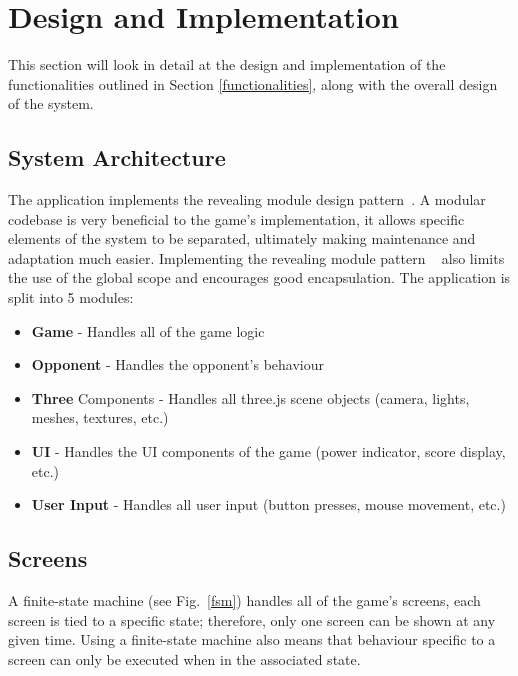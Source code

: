 \documentclass[runningheads]{llncs}
\begin{document}
	\section{Design and Implementation} \label{implementation}
	This section will look in detail at the design and implementation of the functionalities outlined in Section \ref{functionalities}, along with the overall design of the system. 
	\subsection{System Architecture}
	The application implements the revealing module design pattern~\cite{ref_revealing-module-pattern}. A modular codebase is very beneficial to the game's implementation, it allows specific elements of the system to be separated, ultimately making maintenance and adaptation much easier. Implementing the revealing module pattern ~\cite{ref_revealing-module-pattern} also limits the use of the global scope and encourages good encapsulation. The application is split into 5 modules: 
	\begin{itemize}
		\item \textbf{Game} - Handles all of the game logic 
		\item \textbf{Opponent} - Handles the opponent's behaviour
		\item \textbf{Three} Components - Handles all three.js scene objects (camera, lights, meshes, textures, etc.)
		\item \textbf{UI} - Handles the UI components of the game (power indicator, score display, etc.)
		\item \textbf{User Input} - Handles all user input (button presses, mouse movement, etc.)
	\end{itemize}
	\subsection{Screens}
	A finite-state machine (see Fig.~\ref{fsm}) handles all of the game's screens, each screen is tied to a specific state; therefore, only one screen can be shown at any given time. Using a finite-state machine also means that behaviour specific to a screen can only be executed when in the associated state.
	
\end{document}
